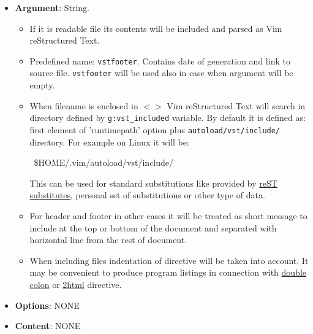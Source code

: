 \documentclass[12pt]{article}
\begin{document}
\begin{itemize}
\item
\textbf{Argument}: String.

 \begin{itemize}
\item
If it is readable file its contents will be included and parsed as Vim reStructured Text.

\item
Predefined name: \texttt{vstfooter}. Contains date of generation and link to
source file. \texttt{vstfooter} will be used also in case when argument will be
empty.

\item
When filename is enclosed in $<$$>$ Vim reStructured Text will search in directory defined by
\texttt{g:vst\_included} variable. By default it is defined as: first element of
'runtimepath' option plus \texttt{autoload/vst/include/} directory. For example
on Linux it will be:

\begin{ttfamily}\begin{flushleft}
\mbox{~\$HOME/.vim/autoload/vst/include/}\\
\end{flushleft}\end{ttfamily}

 This can be used for standard substitutions like provided by \href{http://docutils.sf.net/docs/ref/rst/substitutions.html\#character-entity-sets}{reST
 substitutes}, personal set of substitutions or other type of data.

\item
For header and footer in other cases it will be treated as short message
to include at the top or bottom of the document and separated with
horizontal line from the rest of document.

\item
When including files indentation of directive will be taken into account.
It may be convenient to produce program listings in connection with \href{\#ldouble-colon}{double
colon} or \href{\#l2html}{2html} directive.
\end{itemize}

\item
\textbf{Options}: NONE

\item
\textbf{Content}: NONE
\end{itemize}
\begin{center}
\end{center}
\end{document}
